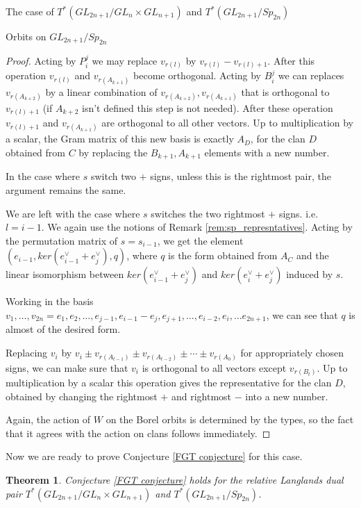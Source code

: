\documentclass[12pt]{article}
\theoremstyle{plain}
\newtheorem{theorem}{Theorem}[section]
\theoremstyle{definition}
\begin{document}
\begin{subsection}{The case of $T^*(GL_{2n+1}/GL_n\times GL_{n+1})$ and $T^*(GL_{2n+1}/Sp_{2n})$}
\begin{subsubsection}{Orbits on $GL_{2n+1}/Sp_{2n}$}
\begin{proof}
    Acting by $P^{j}_{i}$ we may replace $v_{r(l)}$ by $v_{r(l)}-v_{r(l)+1}$. After this operation $v_{r(l)}$ and  $v_{r(A_{k+1})}$ become orthogonal. Acting by $B^{j}_{i}$ we can replaces $v_{r(A_{k+2})}$ by a linear combination of $v_{r(A_{k+2})},v_{r(A_{k+1})}$ that is orthogonal to $v_{r(l)+1}$ (if $A_{k+2}$ isn't defined this step is not needed). After these operation $v_{r(l)+1}$ and $v_{r(A_{k+1})}$ are orthogonal to all other vectors. Up to multiplication by a scalar, the Gram matrix of this new basis is exactly $A_{D}$, for the clan $D$ obtained from $C$ by replacing the $B_{k+1},A_{k+1}$ elements with a new number. 

    In the case where $s$ switch two $+$ signs, unless this is the rightmost pair, the argument remains the same.

    We are left with the case where $s$ switches the two rightmost $+$ signs. i.e. $l=i-1$. We again use the notions of Remark \ref{rem:sp_represntatives}. Acting by the permutation matrix of $s=s_{i-1}$, we get the element $(e_{i-1},ker(e_{i-1}^{\vee}+e_{j}^{\vee}),q)$, where $q$ is the form obtained from $A_{C}$ and the linear isomorphism between $ker(e_{i-1}^{\vee}+e_{j}^{\vee})$ and $ker(e_{i}^{\vee}+e_{j}^{\vee})$ induced by $s$.

    Working in the basis $v_{1},\ldots ,v_{2n} = e_{1},e_{2}, \ldots ,e_{j-1},e_{i-1}-e_{j},e_{j+1},\ldots ,e_{i-2},e_{i}, \ldots e_{2n+1}$, we can see that $q$ is almost of the desired form.

    Replacing $v_{i}$ by $v_{i}\pm v_{r(A_{t-1})}\pm v_{r(A_{t-2})} \pm \cdots \pm v_{r(A_{0})} $ for appropriately chosen signs, we can make sure that $v_{i}$ is orthogonal to all vectors except $v_{r(B_{t})}$. Up to multiplication by a scalar this operation gives the representative for the clan $D$, obtained by changing the rightmost $+$ and rightmost $-$ into a new number. 

Again, the action of $W$ on the Borel orbits is determined by the types, so the fact that it agrees with the action on clans follows
immediately.
\end{proof}

    
\end{subsubsection}
    
Now we are ready to prove Conjecture \ref{FGT conjecture} for this case.

      \begin{theorem}
        Conjecture \ref{FGT conjecture} holds for the relative Langlands dual pair $T^*(GL_{2n+1}/GL_n\times GL_{n+1})$ and $T^*(GL_{2n+1}/Sp_{2n})$.
    \end{theorem}


\end{subsection}
\end{document}
